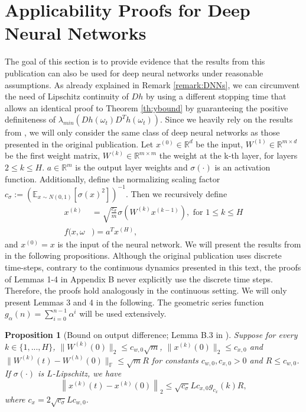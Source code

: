 \documentclass[10pt]{article} %
\newcommand{\bE}{\mathbb{E}}
\newcommand{\bF}{\mathbb{F}}
\newcommand{\bR}{\mathbb{R}}
\newtheorem{proposition}{Proposition}
\begin{document}
\section{Applicability Proofs for Deep Neural Networks}\label{appendix:dnn}
    The goal of this section is to provide evidence that the results from this publication can also be used for deep neural networks under reasonable assumptions. As already explained in Remark \ref{remark:DNNs}, we can circumvent the need of Lipschitz continuity of $Dh$ by using a different stopping time that allows an identical proof to Theorem \ref{th:ybound} by guaranteeing the positive definiteness of $\lambda_{min}(Dh(\omega_t)D^Th(\omega_t))$. Since we heavily rely on the results from \cite{du2019gradientdescentfindsglobal}, we will only consider the same class of deep neural networks as those presented in the original publication. Let $x^{(0)}\in \bR^d$ be the input, $W^{(1)}\in\bR^{m\times d}$ be the first weight matrix, $W^{(k)}\in\bR^{m\times m}$ the weight at the k-th layer, for layers $2\leq k\leq H$. $a\in\bR^m$ is the output layer weights and $\sigma(\cdot)$ is an activation function. Additionally, define the normalizing scaling factor $c_\sigma:=(\bE_{x\sim N(0,1)}[\sigma(x)^2])^{-1}$. Then we recursively define 
    \begin{align}
        x^{(k)}&=\sqrt{\frac{c_\sigma}{m}}\sigma(W^{(k)}x^{(k-1)}),  \text{ for } 1\leq k\leq H\label{eq:deepnn1}\\ 
        f(x,\omega&)=a^T x^{(H)},\label{eq:deepnn2}
    \end{align}
    and $x^{(0)}=x$ is the input of the neural network. We will present the results from \cite{du2019gradientdescentfindsglobal} in the following propositions. Although the original publication uses discrete time-steps, contrary to the continuous dynamics presented in this text, the proofs of Lemmas 1-4 in Appendix B never explicitly use the discrete time steps. Therefore, the proofs hold analogously in the continuous setting. We will only present Lemmas 3 and 4 in the following. The geometric series function $g_\alpha(n)=\sum_{i=0}^{n-1}\alpha^i$ will be used extensively. 
    \begin{proposition}[Bound on output difference; Lemma B.3 in \cite{du2019gradientdescentfindsglobal}]
        Suppose for every $k\in\{1,...,H\}$, $\|W^{(k)}(0)\|_2\leq c_{w,0}\sqrt{m}$, $\|x^{(k)}(0)\|_2\leq c_{x,0}$ and $\|W^{(k)}(t)-W^{(h)}(0)\|_\bF\leq \sqrt{m}R$ for constants $c_{w,0},c_{x,0}>0$ and $R\leq c_{w,0}$. If $\sigma(\cdot)$ is $L$-Lipschitz, we have 
        $$\left\|x^{(k)}(t)-x^{(k)}(0)\right\|_2\leq \sqrt{c_\sigma}Lc_{x,0}g_{c_x}(k)R,$$
        where $c_x=2\sqrt{c_\sigma}Lc_{w,0}$.
    \end{proposition}
\end{document}
